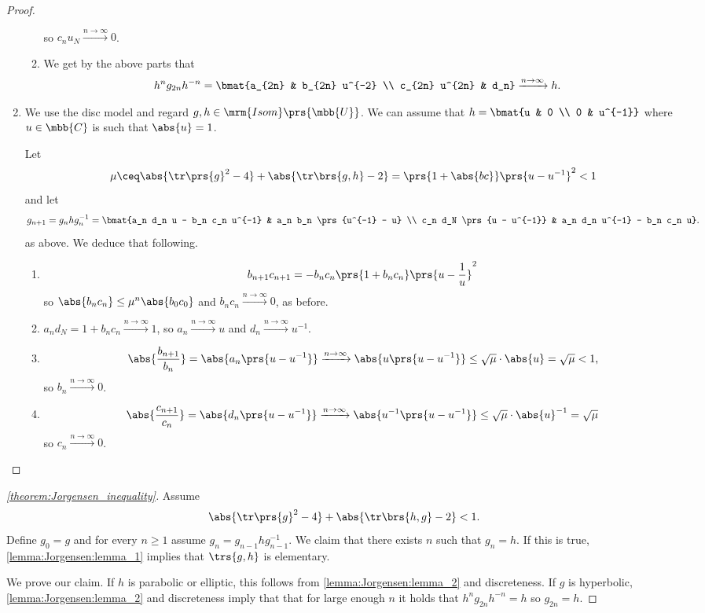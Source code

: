 \documentclass[10pt, twoside]{book}
\begin{document}
\begin{proof}
\begin{enumerate}
\begin{enumerate}
so $c_n u_N \xrightarrow{n\to\infty} 0$.
\item We get by the above parts that
\begin{align*}
h^n g_{2n} h^{-n} &= \bmat{a_{2n} & b_{2n} u^{-2}  \\ c_{2n} u^{2n} & d_n} \xrightarrow{n\to\infty} h \text{.}
\end{align*}
\end{enumerate}
\item%
We use the disc model and regard $g, h \in \mrm{Isom}\prs{\mbb{U}}$. We can assume that $h = \bmat{u & 0 \\ 0 & u^{-1}}$ where $u \in \mbb{C}$ is such that $\abs{u} = 1$.

Let
\[\mu \ceq \abs{\tr\prs{g}^2 - 4} + \abs{\tr\brs{g,h} - 2} = \prs{1 + \abs{bc}} \prs{u - u^{-1}}^2 < 1\]
and let
\[g_{n+1} = g_n h g_n^{-1} = \bmat{a_n d_n u - b_n c_n u^{-1} & a_n b_n \prs{u^{-1} - u} \\ c_n d_N \prs{u - u^{-1}} & a_n d_n u^{-1} - b_n c_n u} \text{.}\]
as above.
We deduce that following.
\begin{enumerate}
\item%
\[b_{n+1} c_{n+1} = - b_n c_n \prs{1 + b_n c_n} \prs{u - \frac{1}{u}}^2\]
so $\abs{b_n c_n} \leq \mu^n \abs{b_0 c_0}$
and $b_n c_n \xrightarrow{n\to\infty} 0$, as before.

\item%
$a_n d_N = 1 + b_n c_n \xrightarrow{n\to\infty} 1$, so $a_n \xrightarrow{n\to\infty} u$ and $d_n \xrightarrow{n\to\infty} u^{-1}$.

\item%
\[\abs{\frac{b_{n+1}}{b_n}} = \abs{a_n \prs{u - u^{-1}}} \xrightarrow{n\to\infty} \abs{u \prs{u - u^{-1}}} \leq \sqrt{\mu} \cdot \abs{u} = \sqrt{\mu} < 1\text{,}\]
so $b_n \xrightarrow{n \to\infty} 0$.
\item
\[\abs{\frac{c_{n+1}}{c_n}} = \abs{d_n \prs{u - u^{-1}}} \xrightarrow{n\to\infty} \abs{u^{-1} \prs{u -u^{-1}}} \leq \sqrt{\mu} \cdot \abs{u}^{-1} = \sqrt{\mu}\]
so $c_n \xrightarrow{n \to\infty} 0$.
\end{enumerate}
\end{enumerate}
\end{proof}

\begin{proof}[\ref{theorem:Jorgensen_inequality}]
Assume \[\abs{\tr\prs{g}^2 - 4} + \abs{\tr\brs{h,g} - 2} < 1 \text{.}\]
Define $g_0 = g$ and for every $n \geq 1$ assume $g_n = g_{n-1} h g_{n-1}^{-1}$.
We claim that there exists $n$ such that $g_n = h$. If this is true, \ref{lemma:Jorgensen:lemma_1} implies that $\trs{g,h}$ is elementary.

We prove our claim. If $h$ is parabolic or elliptic, this follows from \ref{lemma:Jorgensen:lemma_2} and discreteness.
If $g$ is hyperbolic, \ref{lemma:Jorgensen:lemma_2} and discreteness imply that that for large enough $n$ it holds that $h^n g_{2n} h^{-n} = h$ so $g_{2n} = h$.
\end{proof}
\end{document}

